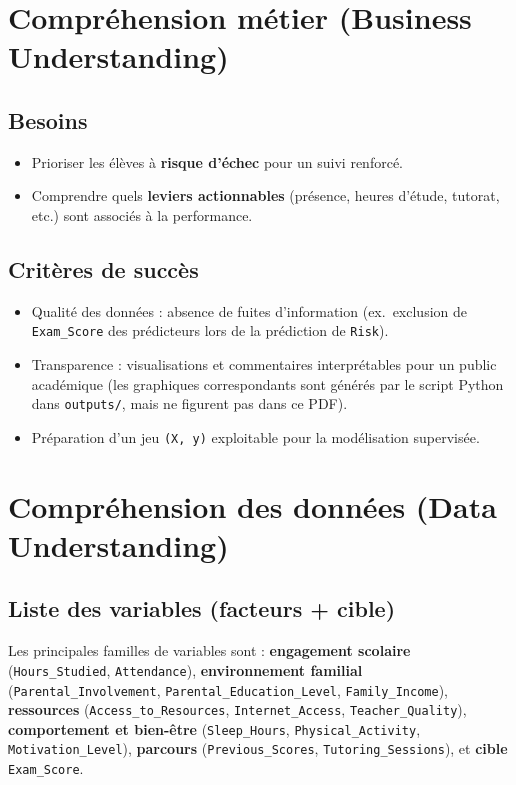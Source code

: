 \documentclass[a4paper,11pt]{article}
\begin{document}
\section{Compréhension métier (Business Understanding)}

\subsection{Besoins}
\begin{itemize}[leftmargin=*]
  \item Prioriser les élèves à \textbf{risque d'échec} pour un suivi renforcé.
  \item Comprendre quels \textbf{leviers actionnables} (présence, heures d'étude, tutorat, etc.) sont associés à la performance.
\end{itemize}

\subsection{Critères de succès}
\begin{itemize}[leftmargin=*]
  \item Qualité des données : absence de fuites d'information (ex.\ exclusion de \texttt{Exam\_Score} des prédicteurs lors de la prédiction de \texttt{Risk}).
  \item Transparence : visualisations et commentaires interprétables pour un public académique (les graphiques correspondants sont générés par le script Python dans \texttt{outputs/}, mais ne figurent pas dans ce PDF).
  \item Préparation d'un jeu \texttt{(X, y)} exploitable pour la modélisation supervisée.
\end{itemize}

\section{Compréhension des données (Data Understanding)}

\subsection{Liste des variables (facteurs + cible)}
Les principales familles de variables sont : \textbf{engagement scolaire} (\texttt{Hours\_Studied}, \texttt{Attendance}), \textbf{environnement familial} (\texttt{Parental\_Involvement}, \texttt{Parental\_Education\_Level}, \texttt{Family\_Income}), \textbf{ressources} (\texttt{Access\_to\_Resources}, \texttt{Internet\_Access}, \texttt{Teacher\_Quality}), \textbf{comportement et bien-être} (\texttt{Sleep\_Hours}, \texttt{Physical\_Activity}, \texttt{Motivation\_Level}), \textbf{parcours} (\texttt{Previous\_Scores}, \texttt{Tutoring\_Sessions}), et \textbf{cible} \texttt{Exam\_Score}.
\end{document}

